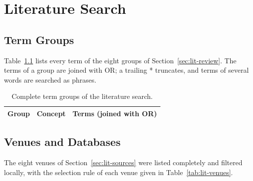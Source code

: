 \chapter{Literature Search}
\label{app:literature}

\section{Term Groups}
\label{app:lit-groups}
Table~\ref{tab:lit-groups-full} lists every term of the eight groups of
Section~\ref{sec:lit-review}. The terms of a group are joined with OR; a
trailing * truncates, and terms of several words are searched as phrases.

\begin{table}[H]
\centering
\begin{singlespace}
\caption[Complete term groups of the literature search]{Complete term groups of
the literature search.}
\label{tab:lit-groups-full}
\small
\begin{tabularx}{\textwidth}{@{}l>{\raggedright\arraybackslash}p{3.3cm}>{\raggedright\arraybackslash}X@{}}
\toprule
\textbf{Group} & \textbf{Concept} & \textbf{Terms (joined with OR)} \\
\midrule
\end{tabularx}
\end{singlespace}
\end{table}

\section{Venues and Databases}
\label{app:lit-sources}
The eight venues of Section~\ref{sec:lit-sources} were listed completely and filtered
locally, with the selection rule of each venue given in Table~\ref{tab:lit-venues}.

